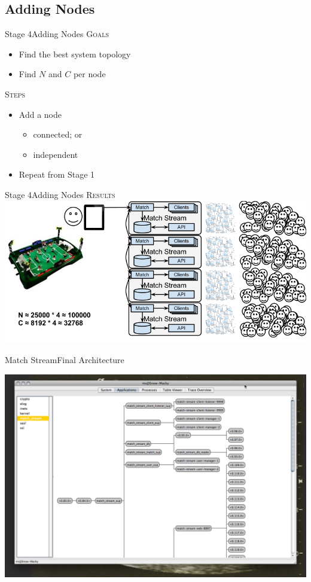 \documentclass[utf8]{beamer}
\begin{document}
\subsection{Adding Nodes}
\begin{frame}{Stage 4}{Adding Nodes}
	\textsc{Goals}
	\begin{itemize}
		\item Find the best system topology
		\item Find $N$ and $C$ \alert{per node}
	\end{itemize}
	\pause
	\textsc{Steps}
	\begin{itemize}
		\item Add a node
		\begin{itemize}
			\item connected; or
			\item independent
		\end{itemize}
		\item Repeat \alert{from Stage 1}
	\end{itemize}
\end{frame}
\begin{frame}{Stage 4}{Adding Nodes}
	\textsc{Results}
	\includegraphics[top=-1,width=\textwidth]{img/MatchStream-4.png}
\end{frame}
\begin{frame}{Match Stream}{Final Architecture}
	\begin{center}
		\includegraphics[height=.75\textheight]{img/running-late.png}
	\end{center}
\end{frame}
\end{document}
